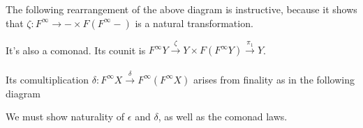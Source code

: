 \documentclass{article}
\begin{document}
The following rearrangement of the above diagram is instructive, because it shows that 
$\zeta : F^{\infty} \to - \times F(F^\infty -)$ is a natural transformation.


\begin{center}
\end{center}  

It's also a comonad. Its counit is 
$F^{\infty}Y \overset{\zeta}{\longrightarrow} Y \times F(F^{\infty} Y) \overset{\pi_1}{\longrightarrow} Y$.
\\~\\
Its comultiplication $\delta : F^{\infty} X \overset{\delta}{\longrightarrow} F^{\infty}(F^{\infty}X)$
arises from finality as in the following diagram
\begin{center}
\end{center}

We must show naturality of $\epsilon$ and $\delta$, as well as the comonad laws.
\end{document}
